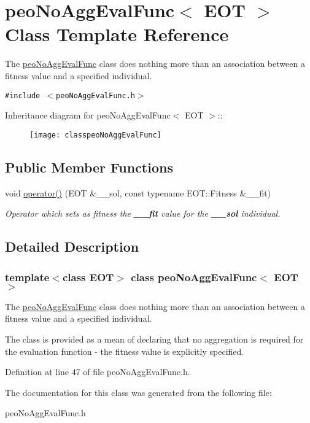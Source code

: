 \hypertarget{classpeoNoAggEvalFunc}{
\section{peo\-No\-Agg\-Eval\-Func$<$ EOT $>$ Class Template Reference}
\label{classpeoNoAggEvalFunc}
}
The \hyperlink{classpeoNoAggEvalFunc}{peo\-No\-Agg\-Eval\-Func} class does nothing more than an association between a fitness value and a specified individual.  


{\tt \#include $<$peo\-No\-Agg\-Eval\-Func.h$>$}

Inheritance diagram for peo\-No\-Agg\-Eval\-Func$<$ EOT $>$::\begin{figure}[H]
\begin{center}
\leavevmode
\texttt{[image: classpeoNoAggEvalFunc]}
\end{center}
\end{figure}
\subsection*{Public Member Functions}
\begin{CompactItemize}
\item 
\hypertarget{classpeoNoAggEvalFunc_1a69ee1af8745ac75c864bf884436de5}{
void \hyperlink{classpeoNoAggEvalFunc_1a69ee1af8745ac75c864bf884436de5}{operator()} (EOT \&\_\-\_\-sol, const typename EOT::Fitness \&\_\-\_\-fit)}
\label{classpeoNoAggEvalFunc_1a69ee1af8745ac75c864bf884436de5}

\begin{CompactList}\small\item\em Operator which sets as fitness the {\bf \_\-\_\-fit} value for the {\bf \_\-\_\-sol} individual. \item\end{CompactList}\end{CompactItemize}


\subsection{Detailed Description}
\subsubsection*{template$<$class EOT$>$ class peo\-No\-Agg\-Eval\-Func$<$ EOT $>$}

The \hyperlink{classpeoNoAggEvalFunc}{peo\-No\-Agg\-Eval\-Func} class does nothing more than an association between a fitness value and a specified individual. 

The class is provided as a mean of declaring that no aggregation is required for the evaluation function - the fitness value is explicitly specified. 



Definition at line 47 of file peo\-No\-Agg\-Eval\-Func.h.

The documentation for this class was generated from the following file:\begin{CompactItemize}
\item 
peo\-No\-Agg\-Eval\-Func.h\end{CompactItemize}
